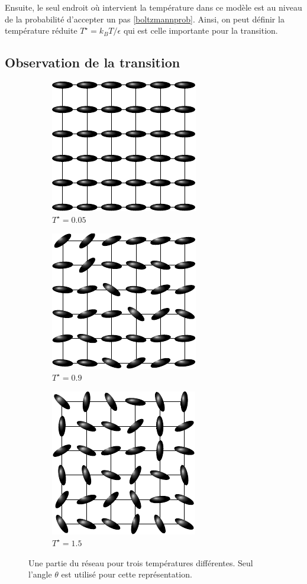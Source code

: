 \documentclass[11pt,a4paper]{article}
\numberwithin{equation}{section}
\begin{document}
Ensuite, le seul endroit où intervient la température dans ce modèle est au niveau de la probabilité d'accepter un pas \ref{boltzmannprob}. Ainsi, on peut définir la température réduite $T^\star = k_B T /\epsilon$ qui est celle importante pour la transition.

\subsection{Observation de la transition}
\begin{figure}[h!]
\center
    \begin{subfigure}[b]{0.30\textwidth}
    	\center
    	\includegraphics[scale=1]{figures/00.pdf}
    	\caption{$T^\star =0.05$}
    	\label{fonda}
    \end{subfigure}	
	\begin{subfigure}[b]{0.30\textwidth}
    	\center
    	\includegraphics[scale=1]{figures/09.pdf}
    	\caption{$T^\star =0.9$}
    	\label{09}
    \end{subfigure}
    \begin{subfigure}[b]{0.30\textwidth}
    	\center
    	\includegraphics[scale=1]{figures/15.pdf}
    	\caption{$T^\star =1.5$}
    	\label{15}
    \end{subfigure}	
    \caption{Une partie du réseau pour trois températures différentes. Seul l'angle $\theta$ est utilisé pour cette représentation. }
    \label{lattice}
\end{figure}
\end{document}
